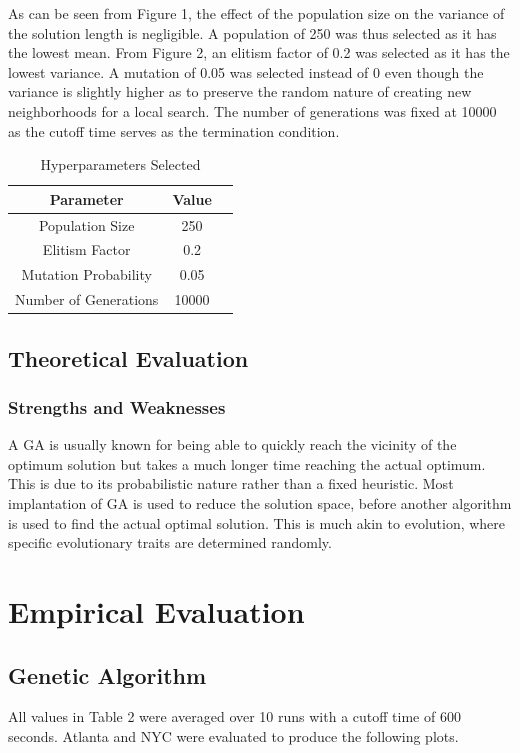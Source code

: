 \documentclass[sigconf]{acmart}
\begin{document}
As can be seen from Figure 1, the effect of the population size on the variance of the solution length is negligible. A population of 250 was thus selected as it has the lowest mean. From Figure 2, an elitism factor of 0.2 was selected as it has the lowest variance. A mutation of 0.05 was selected instead of 0 even though the variance is slightly higher as to preserve the random nature of creating new neighborhoods for a local search. The number of generations was fixed at 10000 as the cutoff time serves as the termination condition.

\begin{table}
  \caption{Hyperparameters Selected}
  \label{tab:freq}
  \begin{tabular}{ccl}
    \toprule
    Parameter&Value\\
    \midrule
    Population Size & 250\\
    Elitism Factor & 0.2\\
    Mutation Probability & 0.05\\
    Number of Generations & 10000\\
  \bottomrule
\end{tabular}
\end{table}

\subsection{Theoretical Evaluation}
\subsubsection{Strengths and Weaknesses}
A GA is usually known for being able to quickly reach the vicinity of the optimum solution but takes a much longer time reaching the actual optimum. This is due to its probabilistic nature rather than a fixed heuristic. Most implantation of GA is used to reduce the solution space, before another algorithm is used to find the actual optimal solution. This is much akin to evolution, where specific evolutionary traits are determined randomly.

\section{Empirical Evaluation}
\subsection{Genetic Algorithm}
All values in Table 2 were averaged over 10 runs with a cutoff time of 600 seconds.
Atlanta and NYC were evaluated to produce the following plots.
\end{document}
